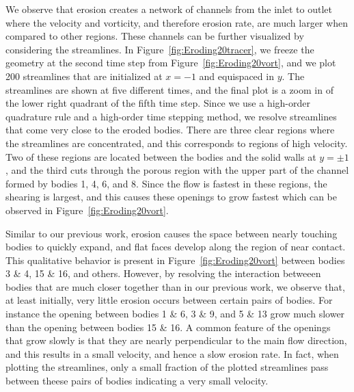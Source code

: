 \documentclass[preprint, 10pt]{elsarticle}
\begin{document}
We observe that erosion creates a network of channels from the inlet to
outlet where the velocity and vorticity, and therefore erosion rate, are
much larger when compared to other regions.  These channels can be
further visualized by considering the streamlines.  In
Figure~\ref{fig:Eroding20tracer}, we freeze the geometry at the second
time step from Figure~\ref{fig:Eroding20vort}, and we plot 200
streamlines that are initialized at $x=-1$ and equispaced in $y$.  The
streamlines are shown at five different times, and the final plot is a
zoom in of the lower right quadrant of the fifth time step.  Since we
use a high-order quadrature rule and a high-order time stepping method,
we resolve streamlines that come very close to the eroded bodies.  There
are three clear regions where the streamlines are concentrated, and this
corresponds to regions of high velocity.  Two of these regions are
located between the bodies and the solid walls at $y=\pm 1$, and the
third cuts through the porous region with the upper part of the channel
formed by bodies 1, 4, 6, and 8.  Since the flow is fastest in these
regions, the shearing is largest, and this causes these openings to grow
fastest which can be observed in Figure~\ref{fig:Eroding20vort}.  

Similar to our previous work, erosion causes the space between nearly
touching bodies to quickly expand, and flat faces develop along the
region of near contact.  This qualitative behavior is present in
Figure~\ref{fig:Eroding20vort} between bodies 3 \& 4, 15 \& 16, and
others.  However, by resolving the interaction betweeen bodies that are
much closer together than in our previous work, we observe that, at
least initially, very little erosion occurs between certain pairs of
bodies.  For instance the opening between bodies 1 \& 6, 3 \& 9, and 5
\& 13 grow much slower than the opening between bodies 15 \& 16.  A
common feature of the openings that grow slowly is that they are nearly
perpendicular to the main flow direction, and this results in a small
velocity, and hence a slow erosion rate.  In fact, when plotting the
streamlines, only a small fraction of the plotted streamlines pass
between theese pairs of bodies indicating a very small velocity.
\end{document}

